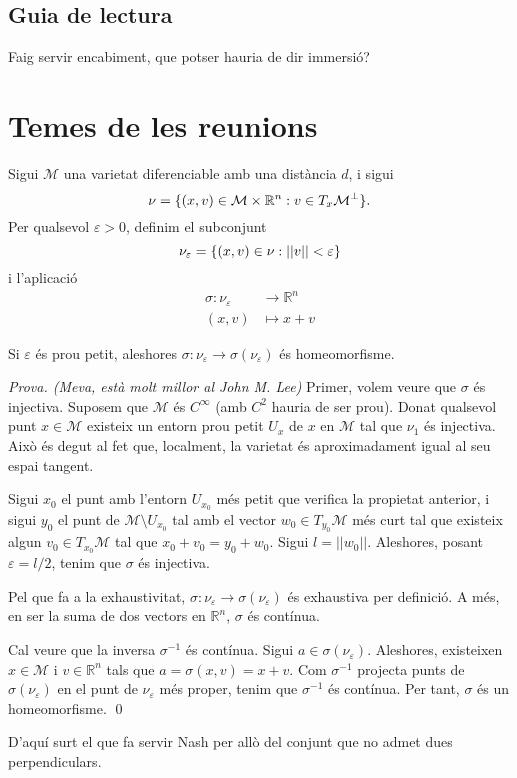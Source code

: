 \subsection*{Guia de lectura}
Faig servir encabiment, que potser hauria de dir immersió?

\setcounter{page}{1}


\section{Temes de les reunions}
Sigui $\mathcal M$ una varietat diferenciable amb una distància $d$, i sigui $$\nu = \{(x,v)\in \mathcal M \times \mathbb R^n: v\in T_x\mathcal M^{\perp}\}.$$ Per qualsevol $\varepsilon > 0$, definim el subconjunt $$\nu_\varepsilon = \{(x,v)\in \nu: ||v|| < \varepsilon\}$$
i l'aplicació $$\begin{aligned}
    \sigma:\nu_\varepsilon &\to \mathbb R^n \\
    (x,v) &\mapsto x+v
\end{aligned}$$
\begin{teo}
    Si $\varepsilon$ és prou petit, aleshores $\sigma:\nu_\varepsilon \to \sigma(\nu_\varepsilon)$ és homeomorfisme.
\end{teo}
{\color{green!50!black}\textit{Prova. (Meva, està molt millor al John M. Lee)} Primer, volem veure que $\sigma$ és injectiva. Suposem que $\mathcal M$ és $C^\infty$ (amb $C^2$ hauria de ser prou). Donat qualsevol punt $x\in\mathcal M$ existeix un entorn prou petit $U_x$ de $x$ en $\mathcal M$ tal que $\nu_1$ és injectiva. Això és degut al fet que, localment, la varietat és aproximadament igual al seu espai tangent. 

Sigui $x_0$ el punt amb l'entorn $U_{x_0}$ més petit que verifica la propietat anterior, i sigui $y_0$ el punt de $\mathcal M\setminus U_{x_0}$ tal amb el vector $w_0\in T_{y_0}\mathcal M$ més curt tal que existeix algun $v_0\in T_{x_0}\mathcal M$ tal que $x_0+v_0=y_0+w_0$. 
Sigui $l=||w_0||$. Aleshores, posant $\varepsilon = l/2$, tenim que $\sigma$ és injectiva. 

Pel que fa a la exhaustivitat, $\sigma:\nu_\varepsilon \to \sigma(\nu_\varepsilon)$ és exhaustiva per definició. A més, en ser la suma de dos vectors en $\mathbb R^n$, $\sigma$ és contínua.

Cal veure que la inversa $\sigma^{-1}$ és contínua. Sigui $a\in \sigma(\nu_\varepsilon)$. Aleshores, existeixen $x\in \mathcal M$ i $v\in \mathbb R^n$ tals que $a=\sigma(x,v)=x+v$. Com $\sigma^{-1}$ projecta punts de $\sigma(\nu_\varepsilon)$ en el punt de $\nu_\varepsilon$ més proper, tenim que $\sigma^{-1}$ és contínua.
Per tant, $\sigma$ és un homeomorfisme. \qed}
\begin{obs} 
    D'aquí surt el que fa servir Nash per allò del conjunt que no admet dues perpendiculars.
\end{obs}
\newpage